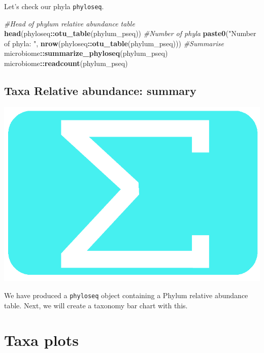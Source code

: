 \documentclass[
]{book}
\newenvironment{Shaded}{\begin{snugshade}}{\end{snugshade}}
\newcommand{\CommentTok}[1]{\textcolor[rgb]{0.56,0.35,0.01}{\textit{#1}}}
\newcommand{\FunctionTok}[1]{\textcolor[rgb]{0.13,0.29,0.53}{\textbf{#1}}}
\newcommand{\NormalTok}[1]{#1}
\newcommand{\SpecialCharTok}[1]{\textcolor[rgb]{0.81,0.36,0.00}{\textbf{#1}}}
\newcommand{\StringTok}[1]{\textcolor[rgb]{0.31,0.60,0.02}{#1}}
\begin{document}
Let's check our phyla \texttt{phyloseq}.

\begin{Shaded}
\begin{Highlighting}[]
\CommentTok{\#Head of phylum relative abundance table}
\FunctionTok{head}\NormalTok{(phyloseq}\SpecialCharTok{::}\FunctionTok{otu\_table}\NormalTok{(phylum\_pseq))}
\CommentTok{\#Number of phyla}
\FunctionTok{paste0}\NormalTok{(}\StringTok{"Number of phyla: "}\NormalTok{, }\FunctionTok{nrow}\NormalTok{(phyloseq}\SpecialCharTok{::}\FunctionTok{otu\_table}\NormalTok{(phylum\_pseq)))}
\CommentTok{\#Summarise}
\NormalTok{microbiome}\SpecialCharTok{::}\FunctionTok{summarize\_phyloseq}\NormalTok{(phylum\_pseq)}
\NormalTok{microbiome}\SpecialCharTok{::}\FunctionTok{readcount}\NormalTok{(phylum\_pseq)}
\end{Highlighting}
\end{Shaded}

\hypertarget{taxa-relative-abundance-summary}{%
\section{Taxa Relative abundance: summary}\label{taxa-relative-abundance-summary}}

\includegraphics{figures/sum_blue.png}

We have produced a \texttt{phyloseq} object containing a Phylum relative abundance table. Next, we will create a taxonomy bar chart with this.

\hypertarget{chaptaxaplots}{%
\chapter{Taxa plots}\label{chaptaxaplots}}
\end{document}
